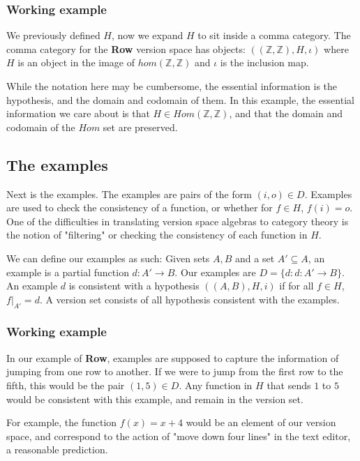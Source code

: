 \documentclass{article}
\theoremstyle{definition}
\begin{document}
\subsubsection{Working example}
We previously defined $H$, now we expand $H$ to sit inside a comma category. The comma category for the \textbf{Row} version space has objects: $((\mathbb{Z}, \mathbb{Z}), H, \iota)$ where $H$ is an object in the image of $hom(\mathbb{Z},\mathbb{Z})$ and $\iota$ is the inclusion map. 

While the notation here may be cumbersome, the essential information is the hypothesis, and the domain and codomain of them.  In this example, the essential information we care about is that $H \in Hom(\mathbb{Z}, \mathbb{Z})$, and that the domain and codomain of the $Hom$ set are preserved.  

\subsection{The examples}
Next is the examples. The examples are pairs of the form $(i,o) \in D$. Examples are used to check the consistency of a function, or whether for $f\in H$, $f(i) = o$. One of the difficulties in translating version space algebras to category theory is the notion of "filtering" or checking the consistency of each function in $H$.  

We can define our examples as such: Given sets $A, B$ and a set $A'\subseteq A$, an example is a partial function $d: A' \rightarrow B$. Our examples are $D = \{d : d: A'\rightarrow B\}$. An example $d$ is consistent with a hypothesis $((A,B), H, i)$ if for all $f \in H$, $f|_{A'} = d$. A version set consists of all hypothesis consistent with the examples.

\subsubsection{Working example}
In our example of \textbf{Row}, examples are supposed to capture the information of jumping from one row to another. If we were to jump from the first row to the fifth, this would be the pair $(1,5)\in D$. Any function in $H$ that sends $1$ to $5$ would be consistent with this example, and remain in the version set. 

For example, the function $f(x) = x + 4$ would be an element of our version space, and correspond to the action of "move down four lines" in the text editor, a reasonable prediction. 
\end{document}
